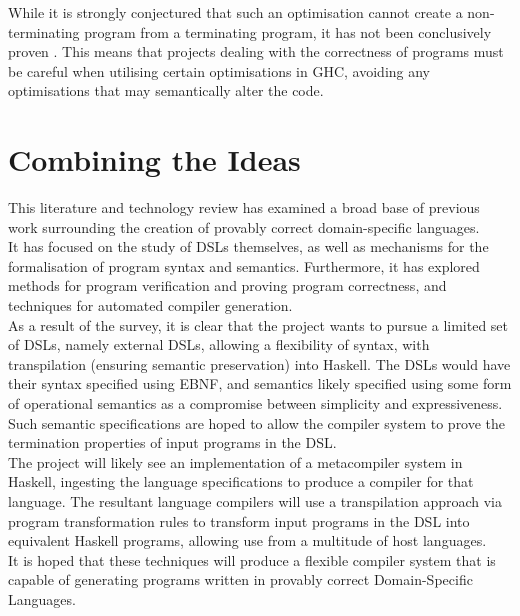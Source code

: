 \documentclass[a4paper,11pt]{report}
\begin{document}
While it is strongly conjectured that such an optimisation cannot create a non-terminating program from a terminating program, it has not been conclusively proven \citep{voigtlander2008semantics}.
This means that projects dealing with the correctness of programs must be careful when utilising certain optimisations in GHC, avoiding any optimisations that may semantically alter the code.



\section{Combining the Ideas} %
\label{sec:combining_the_ideas}
This literature and technology review has examined a broad base of previous work surrounding the creation of provably correct domain-specific languages.\\

It has focused on the study of DSLs themselves, as well as mechanisms for the formalisation of program syntax and semantics. 
Furthermore, it has explored methods for program verification and proving program correctness, and techniques for automated compiler generation. \\

As a result of the survey, it is clear that the project wants to pursue a limited set of DSLs, namely external DSLs, allowing a flexibility of syntax, with transpilation (ensuring semantic preservation) into Haskell.
The DSLs would have their syntax specified using EBNF, and semantics likely specified using some form of operational semantics as a compromise between simplicity and expressiveness. 
Such semantic specifications are hoped to allow the compiler system to prove the termination properties of input programs in the DSL. \\

The project will likely see an implementation of a metacompiler system in Haskell, ingesting the language specifications to produce a compiler for that language. 
The resultant language compilers will use a transpilation approach via program transformation rules to transform input programs in the DSL into equivalent Haskell programs, allowing use from a multitude of host languages. \\

It is hoped that these techniques will produce a flexible compiler system that is capable of generating programs written in provably correct Domain-Specific Languages.






\begin{appendix}

\end{appendix}
\end{document}
